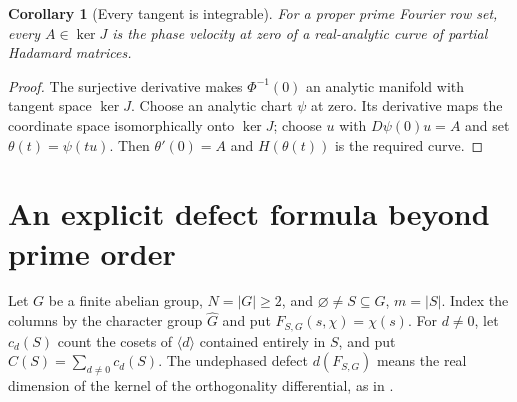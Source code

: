\documentclass[11pt]{article}
\newtheorem{corollary}[theorem]{Corollary}
\begin{document}
\begin{corollary}[Every tangent is integrable]\label{cor:tangents}
For a proper prime Fourier row set, every $A\in\ker J$ is the phase
velocity at zero of a real-analytic curve of partial Hadamard matrices.
\end{corollary}
\begin{proof}
The surjective derivative makes $\Phi^{-1}(0)$ an analytic manifold
with tangent space $\ker J$. Choose an analytic chart $\psi$ at zero.
Its derivative maps the coordinate space isomorphically onto $\ker J$;
choose $u$ with $D\psi(0)u=A$ and set $\theta(t)=\psi(tu)$.
Then $\theta'(0)=A$ and $H(\theta(t))$ is the required curve.
\end{proof}

\section{An explicit defect formula beyond prime order}
Let $G$ be a finite abelian group, $N=|G|\geq2$, and
$\varnothing\ne S\subseteq G$, $m=|S|$. Index the columns by the
character group $\widehat G$ and put $F_{S,G}(s,\chi)=\chi(s)$.
For $d\ne0$, let $c_d(S)$ count the cosets of $\langle d\rangle$
contained entirely in $S$, and put $C(S)=\sum_{d\ne0}c_d(S)$.
The undephased defect $d(F_{S,G})$ means the real dimension of the
kernel of the orthogonality differential, as in
\cite[Definition~1.4 and Proposition~1.5]{BOP}.
\end{document}
